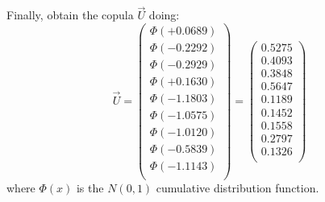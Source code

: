 \documentclass[a4paper,12pt,final]{article}
\begin{document}
Finally, obtain the copula $\vec{U}$ doing:
{\small
\begin{displaymath}
\vec{U} 
=
\left(
\begin{array}{c}
\Phi(+0.0689) \\
\Phi(-0.2292) \\
\Phi(-0.2929) \\
\Phi(+0.1630) \\
\Phi(-1.1803) \\
\Phi(-1.0575) \\
\Phi(-1.0120) \\
\Phi(-0.5839) \\
\Phi(-1.1143) \\
\end{array}
\right) 
=
\left(
\begin{array}{c}
   0.5275 \\
   0.4093 \\
   0.3848 \\
   0.5647 \\
   0.1189 \\
   0.1452 \\
   0.1558 \\
   0.2797 \\
   0.1326 \\
\end{array}
\right) 
\end{displaymath}
}
where $\Phi(x)$ is the $N(0,1)$ cumulative distribution function.
\end{document}
